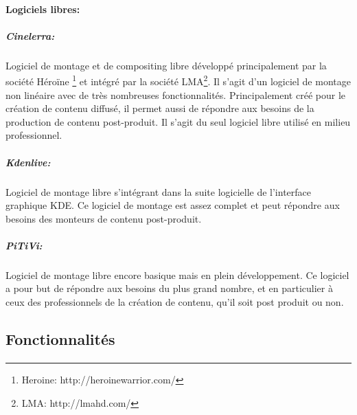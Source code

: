 \paragraph {Logiciels libres:}

\subparagraph{Cinelerra:}

Logiciel de montage et de compositing libre développé principalement
par la société Héroïne \footnote{Heroine: http://heroinewarrior.com/}
et intégré par la société LMA\footnote{LMA: http://lmahd.com/}. Il
s'agit d'un logiciel de montage non linéaire avec de très nombreuses
fonctionnalités. Principalement créé pour le création de contenu
diffusé, il permet aussi de répondre aux besoins de la production
de contenu post-produit. Il s'agit du seul logiciel libre utilisé en
milieu professionnel.

\subparagraph{Kdenlive:}

Logiciel de montage libre s'intégrant dans la suite logicielle de
l'interface graphique KDE.  Ce logiciel de montage est assez complet et
peut répondre aux besoins des monteurs de contenu post-produit.

\subparagraph{PiTiVi:}

Logiciel de montage libre encore basique mais en plein développement.
Ce logiciel a pour but de répondre aux besoins du plus grand nombre,
et en particulier à ceux des professionnels de la création de contenu,
qu'il soit post produit ou non.


\subsection{Fonctionnalités}

\paragraph{}

